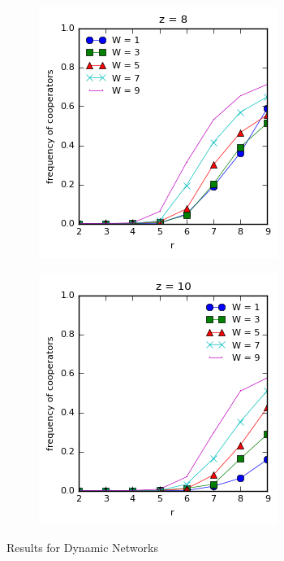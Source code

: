 \documentclass{article}
\begin{document}
\begin{figure}[h]
\begin{subfigure}[b]{0.4\textwidth}
			\caption{}
		\end{subfigure}
		\begin{subfigure}[b]{0.4\textwidth}
			\includegraphics[width=\textwidth]{fig/dynamic/pswitch-z8.png}
			\caption{}
		\end{subfigure}
		\begin{subfigure}[b]{0.4\textwidth}
			\includegraphics[width=\textwidth]{fig/dynamic/pswitch-z10.png}
			\caption{}
		\end{subfigure}
		\caption{Results for Dynamic Networks}
		\label{fig:dynamicnets}
	\end{figure}
\end{document}
